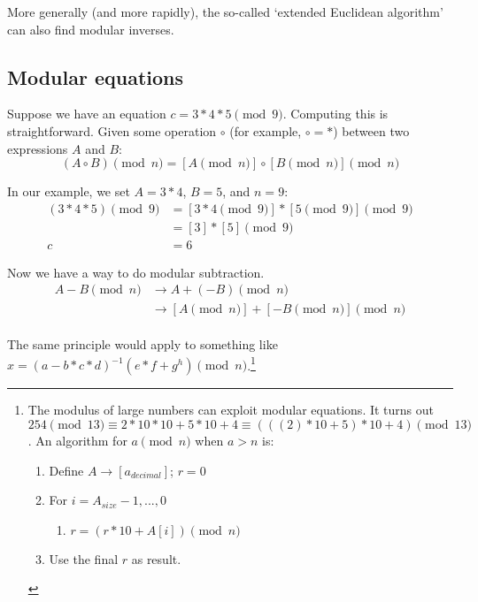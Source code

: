More generally (and more rapidly), the so-called `extended Euclidean algorithm' \cite{extended-euclidean} can also find modular inverses.


\subsection{Modular equations}
\label{subsec:modular-equations}

Suppose we have an equation $c = 3*4*5 \pmod 9$. Computing this is straightforward. Given some operation $\circ$ (for example, $\circ = *$) between two expressions $A$ and $B$:\vspace{.175cm}
\[(A \circ B)\pmod{n} = {[A\pmod {n}] \circ [B\pmod{n}]}\pmod{n}\]

In our example, we set $A = 3*4$, $B = 5$, and $n = 9$:\vspace{.175cm}
\begin{align*}
(3*4 * 5) \pmod{9} &= {[3*4 \pmod {9}] * [5 \pmod{9}]} \pmod{9} \\
				   &= [3]*[5] \pmod 9 \\
				 c &= 6
\end{align*}

Now we have a way to do modular subtraction.\vspace{.175cm}
\begin{align*}
A - B \pmod n &\rightarrow A + (-B) \pmod n \\
			  &\rightarrow {[A \pmod {n}] + [-B \pmod{n}]} \pmod{n}
\end{align*}\\

The same principle would apply to something like $x = (a-b*c*d)^{-1} (e*f+g^{h}) \pmod n$.\footnote{The modulus of large numbers can exploit modular equations. It turns out $254 \pmod {13} \equiv 2*10*10 + 5*10 + 4 \equiv (((2)*10 + 5)*10 + 4) \pmod {13}$. An algorithm for $a \pmod n$ when $a > n$ is:
\begin{enumerate}
	\item Define $A \rightarrow [a_{decimal}]$; $r = 0$
	\item For $i = A_{size} - 1,...,0$
	\begin{enumerate}
		\item $r = (r*10 + A[i]) \pmod n$
	\end{enumerate}
	\item Use the final $r$ as result.
\end{enumerate}}




